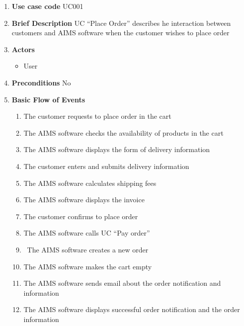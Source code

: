 \documentclass[../UseCaseSpecification.tex]{subfiles}
\begin{document}
    \begin{enumerate}
        \item \textbf{Use case code}
        \newline
        UC001
    
        \item \textbf{Brief Description}
        \newline
        UC “Place Order” describes he interaction between customers and AIMS software when the customer wishes to place order

        \item \textbf{Actors}
        \begin{itemize}
            \item User
        \end{itemize}

        \item \textbf{Preconditions}
        \newline
        No

        \item \textbf{Basic Flow of Events}
        \begin{enumerate}
            \item The customer requests to place order in the cart
            \item The AIMS software checks the availability of products in the cart
            \item The AIMS software displays the form of delivery information
            \item The customer enters and submits delivery information
            \item The AIMS software calculates shipping fees
            \item The AIMS software displays the invoice
            \item The customer confirms to place order
            \item The AIMS software calls UC “Pay order”
            \item \ The AIMS software creates a new order
            \item The AIMS software makes the cart empty
            \item The AIMS software sends email about the order notification and information
            \item The AIMS software displays successful order notification and the order information
        \end{enumerate}


\end{enumerate}
\end{document}
